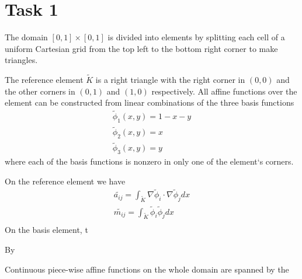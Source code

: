 \documentclass[12pt,a4paper]{report}
\begin{document}
	
\section{Task 1}

The domain $[0, 1] \times [0, 1]$ is divided into elements by splitting each cell of a uniform Cartesian grid from the top left to the bottom right corner to make triangles.

\begin{figure}
	
\end{figure}

The reference element $\tilde{K}$ is a right triangle with the right corner in $(0, 0)$ and the other corners in $(0, 1)$ and $(1, 0)$ respectively. All affine functions over the element can be constructed from linear combinations of the three basis functions
\begin{align}
    \tilde{\phi}_1(x, y) = 1 - x - y \\
    \tilde{\phi}_2(x, y) = x \\
    \tilde{\phi}_3(x, y) = y
\end{align}
where each of the basis functions is nonzero in only one of the element`s corners.

On the reference element we have
\begin{align}
    \tilde{a_{ij}} = \int_{\tilde{K}} \nabla \tilde{\phi}_i \cdot \nabla \tilde{\phi}_j dx \\
    \tilde{m_{ij}} = \int_{\tilde{K}} \tilde{\phi}_i \tilde{\phi}_j dx \\
\end{align}
On the basis element, t

By

Continuous piece-wise affine functions on the whole domain are spanned by the 


	
\end{document}
